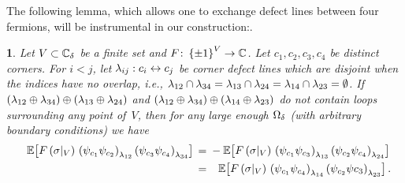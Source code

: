 \documentclass[12pt,oneside,english]{amsart}
\numberwithin{equation}{section}
\numberwithin{figure}{section}
\theoremstyle{plain}
\theoremstyle{plain}
\theoremstyle{plain}
\theoremstyle{plain}
\newtheorem{lem}[thm]{\protect\lemmaname}
\theoremstyle{remark}
\theoremstyle{definition}
\theoremstyle{plain}
\theoremstyle{plain}
\numberwithin{thm}{section}
\newcommand{\kallemod}[1]{{\color{kallecol} {#1}}}
\providecommand{\lemmaname}{Lemma}
\providecommand{\lemmaname}{Lemma}
\providecommand{\lemmaname}{Lemma}
\providecommand{\lemmaname}{Lemma}
\begin{document}
The following lemma, which allows one to exchange defect lines between
four fermions, will be instrumental in our construction:.
\begin{lem}
\label{lem:four-fermion-exchange}Let $V\subset{\mathbb{C}_{{\delta}}}$
be a finite set and $F \colon \left\{  \pm 1  \right\}^{V} \to  \mathbb{C} $. Let
$c_{1},c_{2},c_{3},c_{4}$ be distinct corners.
For $i<j$, let 
${\lambda}_{ij}:c_{i}\leftrightarrow c_{j}$
be corner defect lines which are disjoint when the indices have no
overlap, i.e., 
${\lambda}_{12}\cap{\lambda}_{34} = {\lambda}_{13}\cap{\lambda}_{24}
 = {\lambda}_{14} \cap{\lambda}_{23} = \emptyset$.
If 
$\left({\lambda}_{12}\oplus{\lambda}_{34}\right)\oplus\left({\lambda}_{13}
\oplus{\lambda}_{24}\right)$
and 
$\left({\lambda}_{12}\oplus{\lambda}_{34}\right)\oplus\left({\lambda}_{14}
\oplus{\lambda}_{23}\right)$
do not contain loops surrounding any point of~$V$, then for any 
large enough ${{\Omega}}_{{\delta}}$
(with arbitrary boundary conditions) we have 
\begin{align*}
\phantom{-} \mathbb{E} \! \left[ { F\left({\sigma}|_{V}\right) \,
    \left({\psi}_{c_{1}} {\psi}_{c_{2}}\right)_{{\lambda}_{12}}
    \left({\psi}_{c_{3}} {\psi}_{c_{4}}\right)_{{\lambda}_{34}}
  } \right]
\, = \; & 
  - \mathbb{E} \! \left[ {
    F\left({\sigma}|_{V}\right) \,
    \left({\psi}_{c_{1}} {\psi}_{c_{3}}\right)_{{\lambda}_{13}}
    \left( {\psi}_{c_{2}} {\psi}_{c_{4}}\right)_{{\lambda}_{24}}
  } \right] \\
\, = \; & \phantom{-} \mathbb{E} \! \left[ { F\left({\sigma}|_{V}\right) \,
    \left({\psi}_{c_{1}} {\psi}_{c_{4}}\right)_{{\lambda}_{14}}
    \left({\psi}_{c_{2}} {\psi}{c_{3}} \right)_{{\lambda}_{23}}
  } \right] .
\end{align*}
\end{lem}
\end{document}
